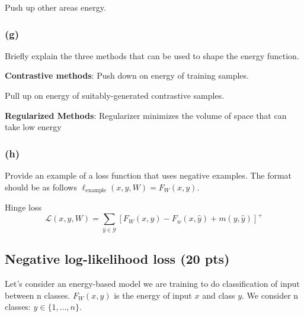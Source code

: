 Push up other areas energy.



\subsubsection*{(g)}
Briefly explain the three methods that can be used to shape the energy function.

\textbf{Contrastive methods}:
Push down on energy of training samples.

Pull up on energy of suitably-generated contrastive samples.

\textbf{Regularized Methods}:
Regularizer minimizes the volume of space that can take low energy


\subsubsection*{(h)}
Provide an example of a loss function that uses negative examples. The format should be as follows $\ell_\text{example}(x, y, W) = F_W(x, y)$.


Hinge loss
\begin{equation}
    \mathcal{L}(x, y, W)=\sum_{\hat{y} \in \mathcal{Y}}\left[F_{W}(x, y)-F_{w}(x, \hat{y})+m(y, \hat{y})\right]^{+}
\end{equation}






\subsection{Negative log-likelihood loss (20 pts) }

Let's consider an energy-based model we are training to do classification of input between n classes. $F_W(x, y)$ is the energy of input $x$ and class $y$. We consider n classes: $y \in \{1, \dots, n\}$.

